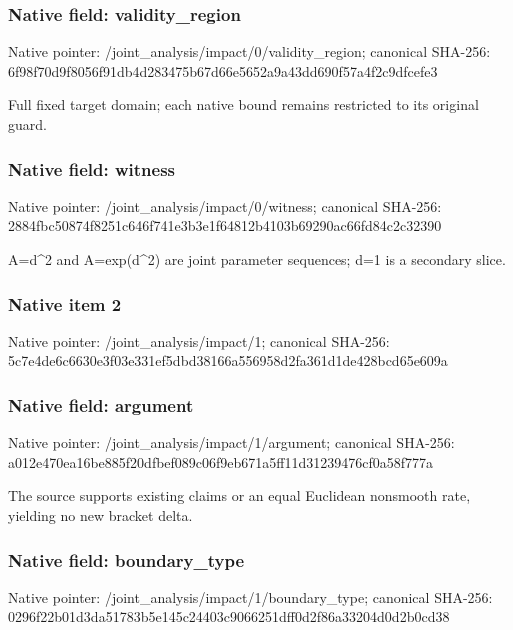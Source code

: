 \documentclass[10pt,a4paper]{article}
\begin{document}
\subsubsection{Native field: validity\_\allowbreak{}region}
Native pointer: /joint\_\allowbreak{}analysis/impact/0/validity\_\allowbreak{}region; canonical SHA-256: 6f98f70d9f8056f91db4d283475b67d66e5652a9a43dd690f57a4f2c9dfcefe3

\begingroup\raggedright\sloppy Full fixed target domain;\allowbreak{} each native bound remains restricted to its original guard.\par\endgroup

\subsubsection{Native field: witness}
Native pointer: /joint\_\allowbreak{}analysis/impact/0/witness; canonical SHA-256: 2884fbc50874f8251c646f741e3b3e1f64812b4103b69290ac66fd84c2c32390

\begingroup\raggedright\sloppy A=\allowbreak{}d\textasciicircum{}2 and A=\allowbreak{}exp(d\textasciicircum{}2) are joint parameter sequences;\allowbreak{} d=\allowbreak{}1 is a secondary slice.\par\endgroup

\subsubsection{Native item 2}
Native pointer: /joint\_\allowbreak{}analysis/impact/1; canonical SHA-256: 5c7e4de6c6630e3f03e331ef5dbd38166a556958d2fa361d1de428bcd65e609a

\subsubsection{Native field: argument}
Native pointer: /joint\_\allowbreak{}analysis/impact/1/argument; canonical SHA-256: a012e470ea16be885f20dfbef089c06f9eb671a5ff11d31239476cf0a58f777a

\begingroup\raggedright\sloppy The source supports existing claims or an equal Euclidean nonsmooth rate,\allowbreak{} yielding no new bracket delta.\par\endgroup

\subsubsection{Native field: boundary\_\allowbreak{}type}
Native pointer: /joint\_\allowbreak{}analysis/impact/1/boundary\_\allowbreak{}type; canonical SHA-256: 0296f22b01d3da51783b5e145c24403c9066251dff0d2f86a33204d0d2b0cd38
\end{document}
